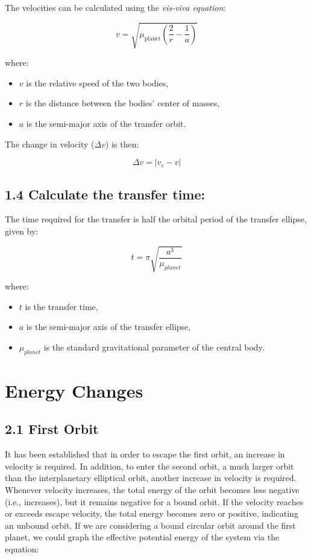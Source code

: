 \documentclass{article}
\numberwithin{figure}{section}
\begin{document}
The velocities can be calculated using the \textit{vis-viva equation}:

\[
v = \sqrt{\mu_{\text{planet}} \left( \frac{2}{r} - \frac{1}{a} \right)}
\]

where:
\begin{itemize}
    \item \(v\) is the relative speed of the two bodies,
    \item \(r\) is the distance between the bodies' center of masses,
    \item \(a\) is the semi-major axis of the transfer orbit.
\end{itemize}

The change in velocity (\(\Delta v\)) is then:

\[
\Delta v = |v_c - v|
\]

\subsection*{1.4 Calculate the transfer time:}
The time required for the transfer is half the orbital period of the transfer ellipse, given by:

\[
t = \pi \sqrt{\frac{a^3}{\mu_{planet}}}
\]

where:
\begin{itemize}
    \item \(t\) is the transfer time,
    \item \(a\) is the semi-major axis of the transfer ellipse,
    \item \(\mu_{planet}\) is the standard gravitational parameter of the central body.
\end{itemize}
\section{Energy Changes}
\subsection{2.1 First Orbit}
It has been established that in order to escape the first orbit, an increase in velocity is required. In addition, to enter the second orbit, a much larger orbit than the interplanetary elliptical orbit, another increase in velocity is required. Whenever velocity increases, the total energy of the orbit becomes less negative (i.e., increases), but it remains negative for a bound orbit. If the velocity reaches or exceeds escape velocity, the total energy becomes zero or positive, indicating an unbound orbit. If we are considering a bound circular orbit around the first planet, we could graph the effective potential energy of the system via the equation:
\end{document}
